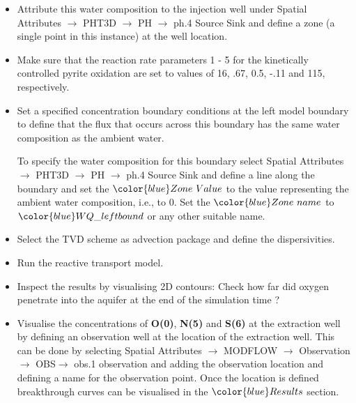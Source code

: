 \begin{itemize}
\item Attribute this water composition to the injection well 
under {\color{blue}Spatial Attributes} $\rightarrow$ {\color{blue}PHT3D} $\rightarrow$ {\color{blue}PH} $\rightarrow$ {\color{blue}ph.4 Source \/ Sink} and define a zone 
(a single point in this instance) at the well location. 

\item Make sure that the reaction rate parameters 1 - 5 for the kinetically
controlled pyrite oxidation are set to values of 16, .67, 0.5, -.11 and 115, respectively.

\item Set a specified concentration boundary conditions at the left model 
boundary to define that the flux that occurs across this boundary 
has the same water composition as the ambient water.   

To specify the water composition for this boundary select 
{\color{blue}Spatial Attributes} $\rightarrow$ {\color{blue}PHT3D} 
$\rightarrow$ {\color{blue}PH} $\rightarrow$ {\color{blue}ph.4 Source \/ Sink} 
and define a line along the boundary and 
set the ${\color{blue}Zone\ Value}$ to the value representing
the ambient water composition, i.e., to 0.
Set the ${\color{blue}Zone \ name}$ to ${\color{blue}WQ\_leftbound}$ 
or any other suitable name.

\item Select the TVD scheme as advection package and define the dispersivities.

\item Run the reactive transport model.

\item Inspect the results by visualising 2D contours: 
Check how far did oxygen penetrate into the aquifer 
at the end of the simulation time ?

\item Visualise the concentrations of {\color{red} \textbf{O(0)}}, {\color{red} \textbf{N(5)}} 
and {\color{red} \textbf{S(6)}} at the extraction well by defining an observation well 
at the location of the extraction well.  
This can be done by selecting {\color{blue}Spatial Attributes} 
$\rightarrow$ {\color{blue}MODFLOW} $\rightarrow$ {\color{blue}Observation} 
$\rightarrow$ {\color{blue}OBS}$\rightarrow$ {\color{blue}obs.1 observation} 
and adding the observation location and defining a name 
for the observation point. Once the location is defined breakthrough 
curves can be visualised in the  ${\color{blue}Results}$ section.

\end{itemize} 

